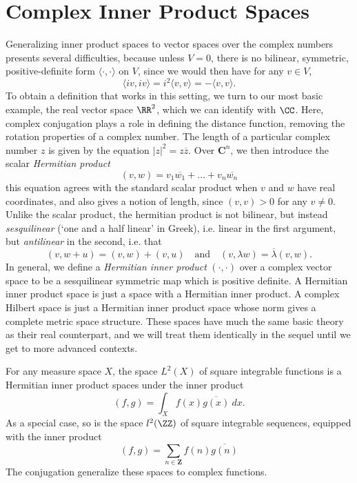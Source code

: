 \section{Complex Inner Product Spaces}

Generalizing inner product spaces to vector spaces over the complex numbers presents several difficulties, because unless $V = 0$, there is no bilinear, symmetric, positive-definite form $\langle \cdot, \cdot \rangle$ on $V$, since we would then have for any $v \in V$,
%
\[ \langle iv, iv \rangle = i^2 \langle v, v \rangle = - \langle v, v \rangle. \]
%
To obtain a definition that works in this setting, we turn to our most basic example, the real vector space $\RR^2$, which we can identify with $\CC$. Here, complex conjugation plays a role in defining the distance function, removing the rotation properties of a complex number. The length of a particular complex number $z$ is given by the equation $|z|^2 = z \overline{z}$. Over $\mathbf{C}^n$, we then introduce the scalar {\it Hermitian product}
%
\[ (v,w) = v_1 \overline{w_1} + \dots + v_n \overline{w_n} \]
%
this equation agrees with the standard scalar product when $v$ and $w$ have real coordinates, and also gives a notion of length, since $(v,v) > 0$ for any $v \neq 0$. Unlike the scalar product, the hermitian product is not bilinear, but instead \emph{sesquilinear} (`one and a half linear' in Greek), i.e. linear in the first argument, but {\it antilinear} in the second, i.e. that
%
\[ (v, w + u) = (v,w) + (v,u) \quad\text{and}\quad (v, \lambda w) = \overline{\lambda} (v,w). \]
%
In general, we define a \emph{Hermitian inner product} $(\cdot, \cdot)$ over a complex vector space to be a sesquilinear symmetric map which is positive definite. A Hermitian inner product space is just a space with a Hermitian inner product. A complex Hilbert space is just a Hermitian inner product space whose norm gives a complete metric space structure. These spaces have much the same basic theory as their real counterpart, and we will treat them identically in the sequel until we get to more advanced contexts.

\begin{example}
    For any measure space $X$, the space $L^2(X)$ of square integrable functions is a  Hermitian inner product spaces under the inner product
    \[ (f,g) = \int_X f(x) \overline{g(x)}\ dx. \]
    As a special case, so is the space $l^2(\ZZ)$ of square integrable sequences, equipped with the inner product
    \[ (f,g) = \sum_{n \in \mathbf{Z}} f(n) \overline{g(n)} \]
    The conjugation generalize these spaces to complex functions.
\end{example}

